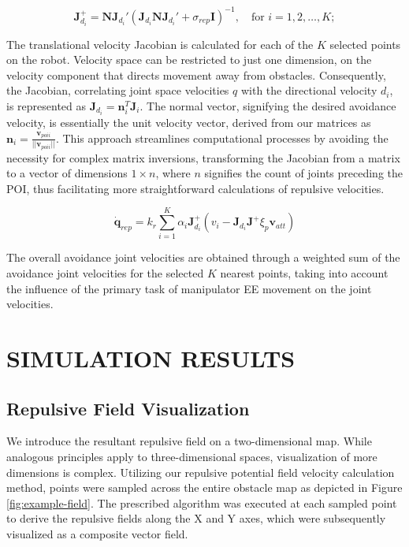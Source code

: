 \documentclass[letterpaper, 10 pt, conference]{ieeeconf}  %
\begin{document}
\begin{equation}
	\mathbf{J}_{d_i}^{+} = \mathbf{N} \mathbf{J}_{d_i}' (\mathbf{J}_{d_i} \mathbf{N} \mathbf{J}_{d_i}' + \sigma_{rep} \mathbf{I})^{-1}, \quad \text{for } i = 1, 2, \ldots, K;
	\label{eq:point_nullspace}
\end{equation}

The translational velocity Jacobian is calculated for each of the $K$ selected points on the robot. Velocity space can be restricted to just one dimension, on the velocity component that directs movement away from obstacles. Consequently, the Jacobian, correlating joint space velocities \(q\) with the directional velocity \(d_i\), is represented as \(\mathbf{J}_{d_i} = \mathbf{n}_i^T \mathbf{J}_i\). The normal vector, signifying the desired avoidance velocity, is essentially the unit velocity vector, derived from our matrices as \(\mathbf{n}_{i} = \frac{\mathbf{v}_{poi i}}{||\mathbf{v}_{poi i}||}\). This approach streamlines computational processes by avoiding the necessity for complex matrix inversions, transforming the Jacobian from a matrix to a vector of dimensions \(1 \times n\), where \(n\) signifies the count of joints preceding the POI, thus facilitating more straightforward calculations of repulsive velocities.

\begin{equation}
	\dot{\mathbf{q}}_{rep} = k_r \sum_{i=1}^{K} \alpha_i \mathbf{J}_{d_i}^{+} \left(v_i - \mathbf{J}_{d_i} \mathbf{J}^{+} \xi_{p} \mathbf{v}_{att}\right)
\end{equation}

The overall avoidance joint velocities are obtained through a weighted sum of the avoidance joint velocities for the selected \(K\) nearest points, taking into account the influence of the primary task of manipulator EE movement on the joint velocities.


\section{SIMULATION RESULTS}

\subsection{Repulsive Field Visualization}

We introduce the resultant repulsive field on a two-dimensional map. While analogous principles apply to three-dimensional spaces, visualization of more dimensions is complex. Utilizing our repulsive potential field velocity calculation method, points were sampled across the entire obstacle map as depicted in Figure \ref{fig:example-field}. The prescribed algorithm was executed at each sampled point to derive the repulsive fields along the X and Y axes, which were subsequently visualized as a composite vector field.
\end{document}
